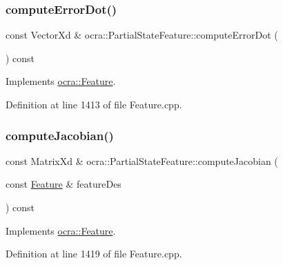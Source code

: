 \subsubsection{\texorpdfstring{compute\+Error\+Dot()}{computeErrorDot()}\hspace{0.1cm}{\footnotesize\ttfamily [2/2]}}
{\footnotesize\ttfamily const Vector\+Xd \& ocra\+::\+Partial\+State\+Feature\+::compute\+Error\+Dot (\begin{DoxyParamCaption}{ }\end{DoxyParamCaption}) const\hspace{0.3cm}{\ttfamily [virtual]}}



Implements \hyperlink{classocra_1_1Feature_a01a4870418ba87d5b41d8f917c1255fc}{ocra\+::\+Feature}.



Definition at line 1413 of file Feature.\+cpp.

\hypertarget{classocra_1_1PartialStateFeature_a8b70dbff8a1a06f16621d34b3e8bc5cf}{}\label{classocra_1_1PartialStateFeature_a8b70dbff8a1a06f16621d34b3e8bc5cf} 
\subsubsection{\texorpdfstring{compute\+Jacobian()}{computeJacobian()}\hspace{0.1cm}{\footnotesize\ttfamily [1/2]}}
{\footnotesize\ttfamily const Matrix\+Xd \& ocra\+::\+Partial\+State\+Feature\+::compute\+Jacobian (\begin{DoxyParamCaption}\item[{const \hyperlink{classocra_1_1Feature}{Feature} \&}]{feature\+Des }\end{DoxyParamCaption}) const\hspace{0.3cm}{\ttfamily [virtual]}}



Implements \hyperlink{classocra_1_1Feature_a4fb8eeeed978a1f727ec43cd1bd18d78}{ocra\+::\+Feature}.



Definition at line 1419 of file Feature.\+cpp.

\hypertarget{classocra_1_1PartialStateFeature_a134ada6399c8f4bda311844c79cd5467}{}\label{classocra_1_1PartialStateFeature_a134ada6399c8f4bda311844c79cd5467} 
